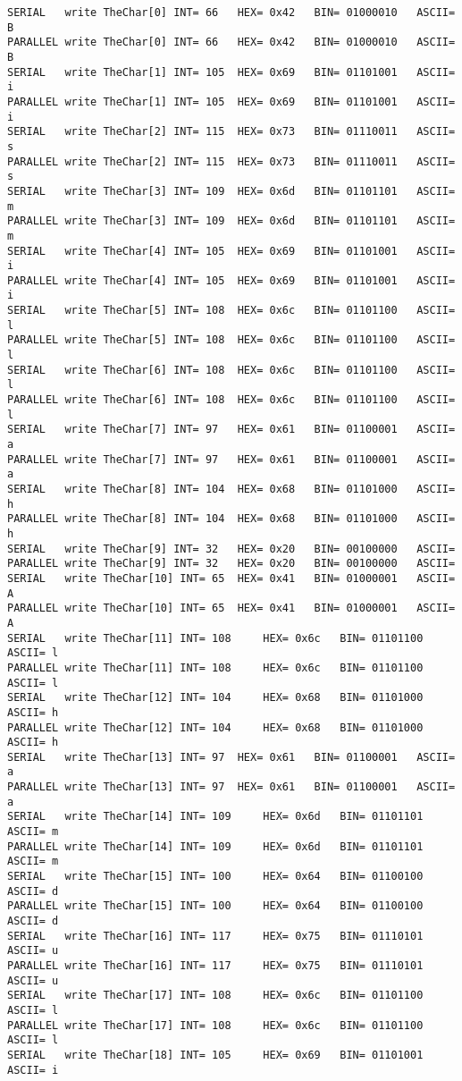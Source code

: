 \begin{lstlisting}[caption={App4-Concurrent Writes to Parallel and Serial Ports}, label=App4-Concurrent Writes to Parallel and Serial Ports]
SERIAL   write TheChar[0] INT= 66 	HEX= 0x42 	BIN= 01000010 	ASCII= B 
PARALLEL write TheChar[0] INT= 66 	HEX= 0x42 	BIN= 01000010 	ASCII= B 
SERIAL   write TheChar[1] INT= 105 	HEX= 0x69 	BIN= 01101001 	ASCII= i 
PARALLEL write TheChar[1] INT= 105 	HEX= 0x69 	BIN= 01101001 	ASCII= i 
SERIAL   write TheChar[2] INT= 115 	HEX= 0x73 	BIN= 01110011 	ASCII= s 
PARALLEL write TheChar[2] INT= 115 	HEX= 0x73 	BIN= 01110011 	ASCII= s 
SERIAL   write TheChar[3] INT= 109 	HEX= 0x6d 	BIN= 01101101 	ASCII= m 
PARALLEL write TheChar[3] INT= 109 	HEX= 0x6d 	BIN= 01101101 	ASCII= m 
SERIAL   write TheChar[4] INT= 105 	HEX= 0x69 	BIN= 01101001 	ASCII= i 
PARALLEL write TheChar[4] INT= 105 	HEX= 0x69 	BIN= 01101001 	ASCII= i 
SERIAL   write TheChar[5] INT= 108 	HEX= 0x6c 	BIN= 01101100 	ASCII= l 
PARALLEL write TheChar[5] INT= 108 	HEX= 0x6c 	BIN= 01101100 	ASCII= l 
SERIAL   write TheChar[6] INT= 108 	HEX= 0x6c 	BIN= 01101100 	ASCII= l 
PARALLEL write TheChar[6] INT= 108 	HEX= 0x6c 	BIN= 01101100 	ASCII= l 
SERIAL   write TheChar[7] INT= 97 	HEX= 0x61 	BIN= 01100001 	ASCII= a 
PARALLEL write TheChar[7] INT= 97 	HEX= 0x61 	BIN= 01100001 	ASCII= a 
SERIAL   write TheChar[8] INT= 104 	HEX= 0x68 	BIN= 01101000 	ASCII= h 
PARALLEL write TheChar[8] INT= 104 	HEX= 0x68 	BIN= 01101000 	ASCII= h 
SERIAL   write TheChar[9] INT= 32 	HEX= 0x20 	BIN= 00100000 	ASCII=   
PARALLEL write TheChar[9] INT= 32 	HEX= 0x20 	BIN= 00100000 	ASCII=   
SERIAL   write TheChar[10] INT= 65 	HEX= 0x41 	BIN= 01000001 	ASCII= A 
PARALLEL write TheChar[10] INT= 65 	HEX= 0x41 	BIN= 01000001 	ASCII= A 
SERIAL   write TheChar[11] INT= 108 	HEX= 0x6c 	BIN= 01101100 	ASCII= l 
PARALLEL write TheChar[11] INT= 108 	HEX= 0x6c 	BIN= 01101100 	ASCII= l 
SERIAL   write TheChar[12] INT= 104 	HEX= 0x68 	BIN= 01101000 	ASCII= h 
PARALLEL write TheChar[12] INT= 104 	HEX= 0x68 	BIN= 01101000 	ASCII= h 
SERIAL   write TheChar[13] INT= 97 	HEX= 0x61 	BIN= 01100001 	ASCII= a 
PARALLEL write TheChar[13] INT= 97 	HEX= 0x61 	BIN= 01100001 	ASCII= a 
SERIAL   write TheChar[14] INT= 109 	HEX= 0x6d 	BIN= 01101101 	ASCII= m 
PARALLEL write TheChar[14] INT= 109 	HEX= 0x6d 	BIN= 01101101 	ASCII= m 
SERIAL   write TheChar[15] INT= 100 	HEX= 0x64 	BIN= 01100100 	ASCII= d 
PARALLEL write TheChar[15] INT= 100 	HEX= 0x64 	BIN= 01100100 	ASCII= d 
SERIAL   write TheChar[16] INT= 117 	HEX= 0x75 	BIN= 01110101 	ASCII= u 
PARALLEL write TheChar[16] INT= 117 	HEX= 0x75 	BIN= 01110101 	ASCII= u 
SERIAL   write TheChar[17] INT= 108 	HEX= 0x6c 	BIN= 01101100 	ASCII= l 
PARALLEL write TheChar[17] INT= 108 	HEX= 0x6c 	BIN= 01101100 	ASCII= l 
SERIAL   write TheChar[18] INT= 105 	HEX= 0x69 	BIN= 01101001 	ASCII= i 

\end{lstlisting}
